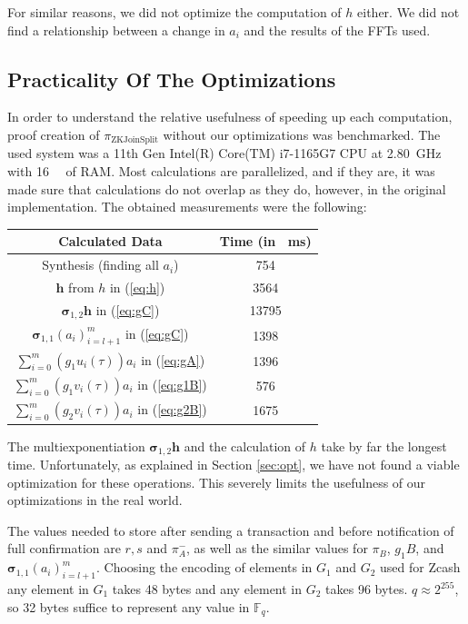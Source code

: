 \documentclass{article}
\begin{document}
For similar reasons, we did not optimize the computation of $h$ either.
We did not find a relationship between a change in $a_i$ and the results of the FFTs used.

\subsection{Practicality Of The Optimizations} \label{sec:benchmarks}

In order to understand the relative usefulness of speeding up each computation, proof creation of $\pi_\text{ZKJoinSplit}$ without our optimizations was benchmarked.
The used system was a 11th Gen Intel(R) Core(TM) i7-1165G7 CPU at \SI{2.80}{\giga\hertz} with \SI{16}{\gibi\byte} of RAM.
Most calculations are parallelized, and if they are, it was made sure that calculations do not overlap as they do, however, in the original implementation.
The obtained measurements were the following:

\begin{center}
\begin{tabular}{ c|c }
        Calculated Data & Time (in \SI{}{\milli\second}) \\
        \hline
        Synthesis (finding all $a_i$) & 754 \\
        $\boldsymbol{h}$ from $h$ in (\ref{eq:h}) & 3564 \\
        $\boldsymbol{\sigma}_{1,2}\boldsymbol{h}$ in (\ref{eq:gC}) & 13795 \\
        $\boldsymbol{\sigma}_{1,1}(a_i)_{i=l+1}^m$ in (\ref{eq:gC}) & 1398 \\
        $\sum_{i=0}^m(g_1u_i(\tau))a_i$ in (\ref{eq:gA}) & 1396 \\
        $\sum_{i=0}^m(g_1v_i(\tau))a_i$ in (\ref{eq:g1B}) & 576  \\
        $\sum_{i=0}^m(g_2v_i(\tau))a_i$ in (\ref{eq:g2B}) & 1675
\end{tabular}
\end{center}

The multiexponentiation $\boldsymbol{\sigma}_{1,2}\boldsymbol{h}$ and the calculation of $h$ take by far the longest time.
Unfortunately, as explained in Section \ref{sec:opt}, we have not found a viable optimization for these operations.
This severely limits the usefulness of our optimizations in the real world.

The values needed to store after sending a transaction and before notification of full confirmation are $r,s$ and $\pi^-_A$, as well as the similar values for $\pi_B$, $g_1B$, and $\boldsymbol\sigma_{1,1}(a_i)_{i=l+1}^m$.
Choosing the encoding of elements in $G_1$ and $G_2$ used for Zcash \cite{hopwood:zcash} any element in $G_1$ takes 48 bytes and any element in $G_2$ takes 96 bytes.
$q \approx 2^{255}$, so 32 bytes suffice to represent any value in $\mathbb{F}_q$.
\end{document}
